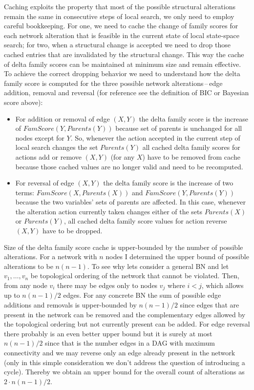 \documentclass[english,cover]{fitthesis} %
\begin{document}
Caching exploits the property that most of the possible structural alterations remain the same in consecutive steps of local search, we only need to employ careful bookkeeping. For one, we need to cache the change of family scores for each network alteration that is feasible in the current state of local state-space search; for two, when a structural change is accepted we need to drop those cached entries that are invalidated by the structural change. This way the cache of delta family scores can be maintained at minimum size and remain effective.
To achieve the correct dropping behavior we need to understand how the delta family score is computed for the three possible network alterations\,--\,edge addition, removal and reversal (for reference see the definition of BIC or Bayesian score above):
\begin{itemize}
	\item For addition or removal of edge $(X,Y)$ the delta family score is the increase of $FamScore(Y,Parents(Y))$ because set of parents is unchanged for all nodes except for $Y$. So, whenever the action accepted in the current step of local search changes the set $Parents(Y)$ all cached delta family scores for actions add or remove $(X,Y)$ (for any $X$) have to be removed from cache because those cached values are no longer valid and need to be recomputed.
	\item For reversal of edge $(X,Y)$ the delta family score is the increase of two terms: $FamScore(X,Parents(X))$ and $FamScore(Y,Parents(Y))$ because the two variables' sets of parents are affected. In this case, whenever the alteration action currently taken changes either of the sets $Parents(X)$ or $Parents(Y)$, all cached delta family score values for action reverse $(X,Y)$ have to be dropped.
\end{itemize}

Size of the delta family score cache is upper-bounded by the number of possible alterations. For a network with $n$ nodes I determined the upper bound of possible alterations to be $n(n-1)$. To see why lets consider a general BN and let $v_1, \dots, v_n$ be topological ordering of the network that cannot be violated. Then, from any node $v_i$ there may be edges only to nodes $v_j$ where $i < j$, which allows up to $n(n-1)/2$ edges. For any concrete BN the sum of possible edge additions and removals is upper-bounded by $n(n-1)/2$ since edges that are present in the network can be removed and the complementary edges allowed by the topological ordering but not currently present can be added. For edge reversal there probably is an even better upper bound but it is surely at most $n(n-1)/2$ since that is the number edges in a DAG with maximum connectivity and we may reverse only an edge already present in the network (only in this simple consideration we don't address the question of introducing a cycle). Thereby we obtain an upper bound for the overall count of alterations as $2 \cdot n(n-1)/2$.
\end{document}
